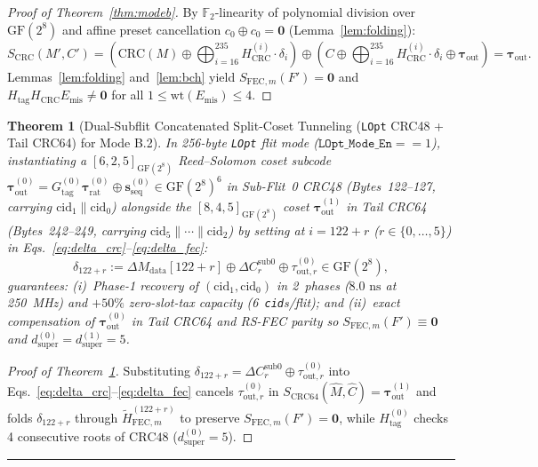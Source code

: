 \documentclass[10pt,twocolumn]{article}
\makeatletter
\newif\ifspecintwocol \specintwocolfalse
\newif\ifspecresume   \specresumefalse
\newcommand{\StartTwoCol}{%
  \if@twocolumn
    \let\spec@next\@empty
  \else
    \ifspecintwocol
      \let\spec@next\@empty
    \else
      \global\specintwocoltrue
      \def\spec@next{\begin{multicols}{2}}%
    \fi
  \fi
  \spec@next
}
\newcommand{\EndConnesPlate}{%
  \par\vspace{3pt}\noindent\textcolor{black!25}{\rule{\textwidth}{0.4pt}}\par\vspace{4pt}%
  \ifspecresume
    \global\specresumefalse
    \let\spec@platepost\StartTwoCol
  \else
    \let\spec@platepost\@empty
  \fi
  \spec@platepost
}
\theoremstyle{spectralthm}
\newtheorem{theorem}{Theorem}[section]
\makeatother
\begin{document}
\begin{proof}[Proof of Theorem~\ref{thm:modeb}]
By $\mathbb{F}_2$-linearity of polynomial division over $\mathrm{GF}(2^8)$ and affine preset cancellation $c_0 \oplus c_0 = \mathbf{0}$ (Lemma~\ref{lem:folding}):
\begin{equation}
\label{eq:crc_cancel}
S_{\mathrm{CRC}}(M', C') = \left(\mathrm{CRC}(M) \oplus \bigoplus_{i=16}^{235} H_{\mathrm{CRC}}^{(i)} \cdot \delta_i\right)
\oplus \left(C \oplus \bigoplus_{i=16}^{235} H_{\mathrm{CRC}}^{(i)} \cdot \delta_i \oplus \boldsymbol{\tau}_{\mathrm{out}}\right) = \boldsymbol{\tau}_{\mathrm{out}}.
\end{equation}
Lemmas~\ref{lem:folding} and~\ref{lem:bch} yield $S_{\mathrm{FEC},m}(F') = \mathbf{0}$ and $H_{\mathrm{tag}} H_{\mathrm{CRC}} E_{\mathrm{mis}} \neq \mathbf{0}$ for all $1 \le \mathrm{wt}(E_{\mathrm{mis}}) \le 4$.
\end{proof}

\begin{theorem}[Dual-Subflit Concatenated Split-Coset Tunneling (\texttt{LOpt} CRC48 + Tail CRC64) for Mode B.2]
\label{thm:split_coset}
In 256-byte \texttt{LOpt} flit mode ($\texttt{LOpt\_Mode\_En} == 1$), instantiating a $[6,2,5]_{\mathrm{GF}(2^8)}$ Reed--Solomon coset subcode $\boldsymbol{\tau}_{\mathrm{out}}^{(0)} = G_{\mathrm{tag}}^{(0)}\boldsymbol{\tau}_{\mathrm{rat}}^{(0)} \oplus \mathbf{s}_{\mathrm{seq}}^{(0)} \in \mathrm{GF}(2^8)^6$ in Sub-Flit~0 CRC48 (Bytes~122--127, carrying $\mathrm{cid}_1 \parallel \mathrm{cid}_0$) alongside the $[8,4,5]_{\mathrm{GF}(2^8)}$ coset $\boldsymbol{\tau}_{\mathrm{out}}^{(1)}$ in Tail CRC64 (Bytes~242--249, carrying $\mathrm{cid}_5 \parallel \cdots \parallel \mathrm{cid}_2$) by setting at $i = 122 + r$ ($r \in \{0,\ldots,5\}$) in Eqs.~\eqref{eq:delta_crc}--\eqref{eq:delta_fec}:
\begin{equation}
\label{eq:split_coset_delta}
\delta_{122+r} := \Delta M_{\mathrm{data}}[122+r] \oplus \Delta C_r^{\mathrm{sub0}} \oplus \tau_{\mathrm{out},r}^{(0)} \in \mathrm{GF}(2^8),
\end{equation}
guarantees: (i)~Phase-1 recovery of $(\mathrm{cid}_1, \mathrm{cid}_0)$ in 2~phases ($8.0\text{~ns}$ at 250~MHz) and $+50\%$ zero-slot-tax capacity (6~\texttt{cid}s/flit); and (ii)~exact compensation of $\boldsymbol{\tau}_{\mathrm{out}}^{(0)}$ in Tail CRC64 and RS-FEC parity so $S_{\mathrm{FEC},m}(F') \equiv \mathbf{0}$ and $d_{\mathrm{super}}^{(0)} = d_{\mathrm{super}}^{(1)} = 5$.
\end{theorem}
\begin{proof}[Proof of Theorem~\ref{thm:split_coset}]
Substituting $\delta_{122+r} = \Delta C_r^{\mathrm{sub0}} \oplus \tau_{\mathrm{out},r}^{(0)}$ into Eqs.~\eqref{eq:delta_crc}--\eqref{eq:delta_fec} cancels $\tau_{\mathrm{out},r}^{(0)}$ in $S_{\mathrm{CRC64}}(\hat{M},\hat{C}) = \boldsymbol{\tau}_{\mathrm{out}}^{(1)}$ and folds $\delta_{122+r}$ through $\tilde{H}_{\mathrm{FEC},m}^{(122+r)}$ to preserve $S_{\mathrm{FEC},m}(F') = \mathbf{0}$, while $H_{\mathrm{tag}}^{(0)}$ checks 4 consecutive roots of $\mathrm{CRC48}$ ($d_{\mathrm{super}}^{(0)} = 5$).
\end{proof}
\EndConnesPlate
\end{document}
